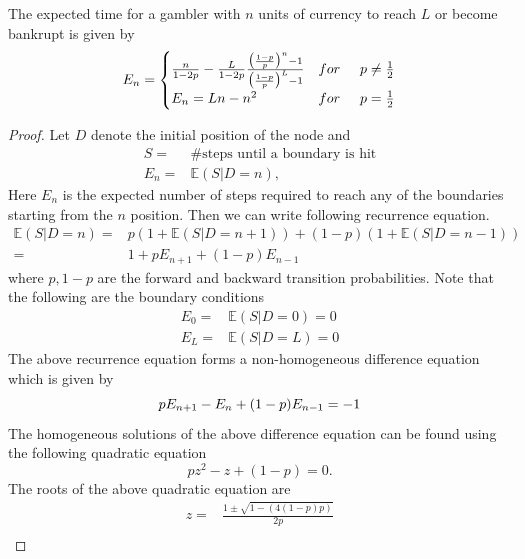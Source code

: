 \documentclass[a4paper,10pt,english]{article}
\begin{document}
\begin{thm}
The expected time for a gambler with $n$ units of currency to reach $L$ or become bankrupt is given by\\
	\begin{equation*}
	E_n=
	\begin{cases}
	\frac{n}{1-2p}-\frac{L}{1-2p}\frac{\big(\frac{1-p}{p}\big)^n-1}{\big(\frac{1-p}{p}\big)^L-1}  &for\hspace{.5cm} p\neq \frac{1}{2}\\
	E_n=Ln-n^2    &  for \hspace{.5cm}p= \frac{1}{2}
	\end{cases}
	\end{equation*}
\end{thm}

\begin{proof}
	Let $D$ denote the initial position of the node and 
	\begin{align*}
	S=&\text{\# steps until a boundary is hit}\\
	E_n=&\mathbb{E}(S|D=n),
	\end{align*}
	Here $E_n$ is the expected number of steps required to reach any of the boundaries starting from the $n$ position. Then we can write following recurrence equation.
	\begin{align*}
	\mathbb{E}(S|D=n)=&p(1+\mathbb{E}(S|D=n+1))+(1-p)(1+\mathbb{E}(S|D=n-1))\\
	=&1+p E_{n+1}+(1-p)E_{n-1}
	\end{align*}
	where $p,1-p$ are the forward and backward transition probabilities. Note that the following are the boundary conditions
	\begin{align*}
	E_0=&\mathbb{E}(S|D=0)=0\\
	E_L=&\mathbb{E}(S|D=L)=0
	\end{align*}
	The above recurrence equation forms a  non-homogeneous difference equation which is given by
	\begin{equation*}
	p E_{n+1}-E_{n}+(1-p)E_{n-1}=-1\\
	\end{equation*}
	The homogeneous solutions of the above difference equation can be found using the following quadratic equation
	\begin{equation*}
	pz^2-z+(1-p)=0.
	\end{equation*}
	The roots of the above quadratic equation are 
	\begin{align*}
	z=&\frac{1\pm \sqrt{1-(4(1-p)p)}}{2p}\\

\end{align*}
\end{proof}
\end{document}
